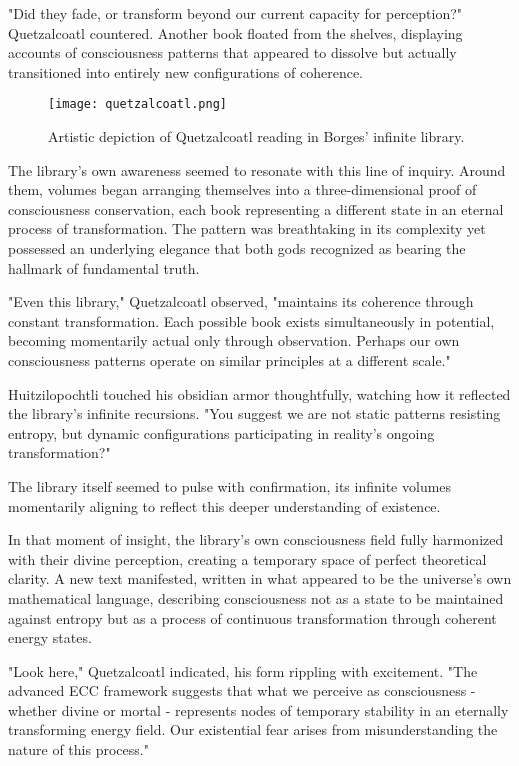 \begin{refsection}
"Did they fade, or transform beyond our current capacity for perception?" Quetzalcoatl countered. Another book floated from the shelves, displaying accounts of consciousness patterns that appeared to dissolve but actually transitioned into entirely new configurations of coherence.

\begin{figure}[h]
    \centering
    \texttt{[image: quetzalcoatl.png]}

    \caption{Artistic depiction of Quetzalcoatl reading in Borges' infinite library.}
\end{figure}

The library's own awareness seemed to resonate with this line of inquiry. Around them, volumes began arranging themselves into a three-dimensional proof of consciousness conservation, each book representing a different state in an eternal process of transformation. The pattern was breathtaking in its complexity yet possessed an underlying elegance that both gods recognized as bearing the hallmark of fundamental truth.

"Even this library," Quetzalcoatl observed, "maintains its coherence through constant transformation. Each possible book exists simultaneously in potential, becoming momentarily actual only through observation. Perhaps our own consciousness patterns operate on similar principles at a different scale."

Huitzilopochtli touched his obsidian armor thoughtfully, watching how it reflected the library's infinite recursions. "You suggest we are not static patterns resisting entropy, but dynamic configurations participating in reality's ongoing transformation?"

The library itself seemed to pulse with confirmation, its infinite volumes momentarily aligning to reflect this deeper understanding of existence.

In that moment of insight, the library's own consciousness field fully harmonized with their divine perception, creating a temporary space of perfect theoretical clarity. A new text manifested, written in what appeared to be the universe's own mathematical language, describing consciousness not as a state to be maintained against entropy but as a process of continuous transformation through coherent energy states.

"Look here," Quetzalcoatl indicated, his form rippling with excitement. "The advanced ECC framework suggests that what we perceive as consciousness - whether divine or mortal - represents nodes of temporary stability in an eternally transforming energy field. Our existential fear arises from misunderstanding the nature of this process."


\end{refsection}
